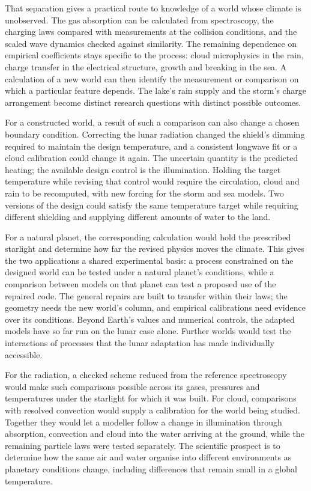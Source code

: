 That separation gives a practical route to knowledge of a world whose climate is unobserved. The gas
absorption can be calculated from spectroscopy, the charging laws compared with measurements at the
collision conditions, and the scaled wave dynamics checked against similarity. The remaining dependence
on empirical coefficients stays specific to the process: cloud microphysics in the rain, charge transfer
in the electrical structure, growth and breaking in the sea. A calculation of a new world can then
identify the measurement or comparison on which a particular feature depends. The lake's rain supply and
the storm's charge arrangement become distinct research questions with distinct possible outcomes.

For a constructed world, a result of such a comparison can also change a chosen boundary condition.
Correcting the lunar radiation changed the shield's dimming required to maintain the design temperature,
and a consistent longwave fit or a cloud calibration could change it again. The uncertain quantity is the
predicted heating; the available design control is the illumination. Holding the target temperature while
revising that control would require the circulation, cloud and rain to be recomputed, with new forcing for
the storm and sea models. Two versions of the design could satisfy the same temperature target while
requiring different shielding and supplying different amounts of water to the land.

For a natural planet, the corresponding calculation would hold the prescribed starlight and determine how
far the revised physics moves the climate. This gives the two applications a shared experimental basis:
a process constrained on the designed world can be tested under a natural planet's conditions, while a
comparison between models on that planet can test a proposed use of the repaired code. The general repairs
are built to transfer within their laws; the geometry needs the new world's column, and empirical
calibrations need evidence over its conditions. Beyond Earth's values and numerical controls, the
adapted models have so far run on the lunar case alone. Further worlds would test the interactions of
processes that the lunar adaptation has made individually accessible.

For the radiation, a checked scheme reduced from the reference spectroscopy would make such comparisons
possible across its gases, pressures and temperatures under the starlight for which it was built.
For cloud, comparisons with resolved convection would supply a calibration for the world being studied.
Together they would let a modeller follow a change in illumination through absorption, convection and
cloud into the water arriving at the ground, while the remaining particle laws were tested separately.
The scientific prospect is to determine how the same air and water organise into different environments
as planetary conditions change, including differences that remain small in a global temperature.

